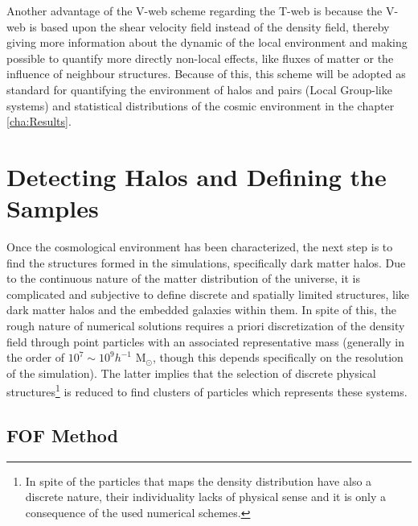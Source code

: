 Another advantage of the V-web scheme regarding the T-web is because the 
V-web is based upon the shear velocity field instead of the density field, 
thereby giving more information about the dynamic of the local environment
and making possible to quantify more directly non-local effects, like fluxes
of matter or the influence of neighbour structures. Because of this, this 
scheme will be adopted as standard for quantifying the environment of halos
and pairs (Local Group-like systems) and statistical distributions of the 
cosmic environment in the chapter \ref{cha:Results}.







\section{Detecting Halos and Defining the Samples}
\label{sec:HalosDetectionAndSampleDefinitions}


Once the cosmological environment has been characterized, the next step is
to find the structures formed in the simulations, specifically dark matter
halos. Due to the continuous nature of the matter distribution of the 
universe, it is complicated and subjective to define discrete and spatially
limited structures, like dark matter halos and the embedded galaxies within
them. In spite of this, the rough nature of numerical solutions requires a 
priori discretization of the density field through point particles with an
associated representative mass (generally in the order of $10^7 
\sim 10^9 h^{-1}$ M$_{\odot}$, though this depends specifically on the 
resolution of the simulation). The latter implies that the selection of 
discrete physical structures\footnote{ In spite of the particles that maps 
the density distribution have also a discrete nature, their individuality 
lacks of physical sense and it is only a consequence of the used numerical 
schemes.} is reduced to find clusters of particles which represents these
systems.



	\subsection{FOF Method}
	\label{subsec:FOFMethod}
	
